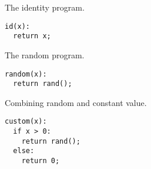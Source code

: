 \begin{marginlisting}[*1]
  \caption{The identity program.}
  \vspace{\lineheight}
\begin{lstlisting}
id(x):
  return x;
\end{lstlisting}
\end{marginlisting}
\begin{marginlisting}[*5]
  \caption{The random program.}
  \vspace{\lineheight}
\begin{lstlisting}
random(x):
  return rand();
\end{lstlisting}
\end{marginlisting}
\begin{marginlisting}[*9]
  \caption{Combining random and constant value.}
  \vspace{2\lineheight}
\begin{lstlisting}
custom(x):
  if x > 0:
    return rand();
  else:
    return 0;
\end{lstlisting}
\end{marginlisting}
